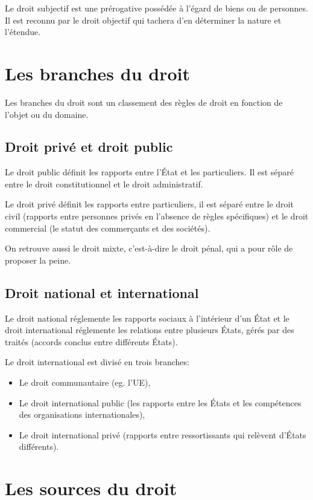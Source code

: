\documentclass[10pt,a4paper]{article}
\begin{document}
Le droit subjectif est une prérogative possédée à l'égard de biens ou de personnes. Il est reconnu par le droit objectif qui tachera d'en déterminer la nature et l'étendue.

\section{Les branches du droit}

Les branches du droit sont un classement des règles de droit en fonction de l'objet ou du domaine.

\subsection{Droit privé et droit public}

Le droit public définit les rapports entre l'État et les particuliers. Il est séparé entre le droit constitutionnel et le droit administratif.

Le droit privé définit les rapports entre particuliers, il est séparé entre le droit civil (rapports entre personnes privés en l'absence de règles spécifiques) et le droit commercial (le statut des commerçants et des sociétés).

On retrouve aussi le droit mixte, c'est-à-dire le droit pénal, qui a pour rôle de proposer la peine.

\subsection{Droit national et international}

Le droit national réglemente les rapports sociaux à l'intérieur d'un État et le droit international réglemente les relations entre plusieurs États, gérés par des traités (accords conclus entre différents États).

Le droit international est divisé en trois branches:
\begin{itemize}
\item Le droit communautaire (eg. l'UE),
\item Le droit international public (les rapports entre les États et les compétences des organisations internationales),
\item Le droit international privé (rapports entre ressortissants qui relèvent d'États différents).
\end{itemize}

\section{Les sources du droit}
\end{document}
